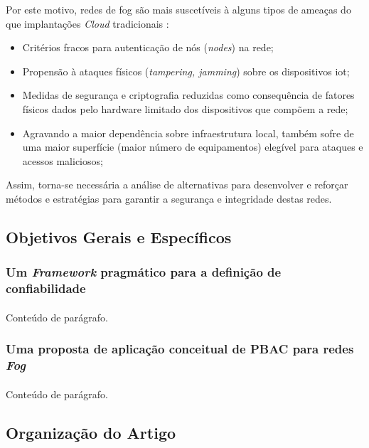 \documentclass[12pt]{article}
\begin{document}
Por este motivo, redes de \gls{fog} são mais suscetíveis à alguns tipos de ameaças do que implantações \textit{Cloud}
tradicionais \cite{alhazmi2019,srirama2024,khan2017}:
\begin{itemize}
  \item Critérios fracos para autenticação de nós (\textit{nodes}) na rede;
  \item Propensão à ataques físicos (\textit{tampering, jamming}) sobre os dispositivos \gls{iot};
  \item Medidas de segurança e criptografia reduzidas como consequência de  fatores físicos dados pelo hardware limitado
    dos dispositivos que compõem a rede;
  \item Agravando a maior dependência sobre infraestrutura local, também sofre de uma maior superfície (maior número de equipamentos)
    elegível para ataques e acessos maliciosos;
\end{itemize}

Assim, torna-se necessária a análise de alternativas para desenvolver e reforçar métodos e estratégias para garantir a
segurança e integridade destas redes.

\subsection{Objetivos Gerais e Específicos}
\subsubsection{Um \textit{Framework} pragmático para a definição de confiabilidade}
\paragraph{}
Conteúdo de parágrafo.

\subsubsection{Uma proposta de aplicação conceitual de PBAC para redes \textit{Fog}}
\paragraph{}
Conteúdo de parágrafo.

\subsection{Organização do Artigo}
\end{document}

